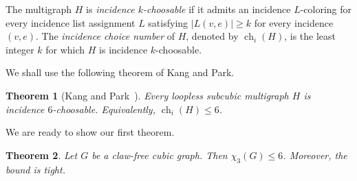 \documentclass[10pt,a4paper]{article}
\newtheorem{theorem}             {Theorem}
\theoremstyle{case}
\numberwithin{subcase}{case}
\begin{document}
The multigraph $H$ is \emph{incidence $k$-choosable} if it admits an
incidence $L$-coloring for every incidence list assignment $L$
satisfying
$
    |L(v,e)|\geq k
$
for every incidence $(v,e)$. The \emph{incidence choice number} of $H$,
denoted by $\operatorname{ch}_{i}(H)$, is the least integer $k$ for
which $H$ is incidence $k$-choosable.

We shall use the following theorem of Kang and Park.

\begin{theorem}[Kang and Park~\cite{KangPark2019}]
\label{thm:kang-park}
Every loopless subcubic multigraph $H$ is incidence
$6$-choosable. Equivalently,
$    \operatorname{ch}_{i}(H)\leq 6$.
\end{theorem}

We are ready to show our first theorem.

\begin{theorem} \label{thm:clawfreeleq6}
Let $G$ be a claw-free cubic graph. Then $\chi_3(G)\leq 6$.
Moreover, the bound is tight.
\end{theorem}
\end{document}
